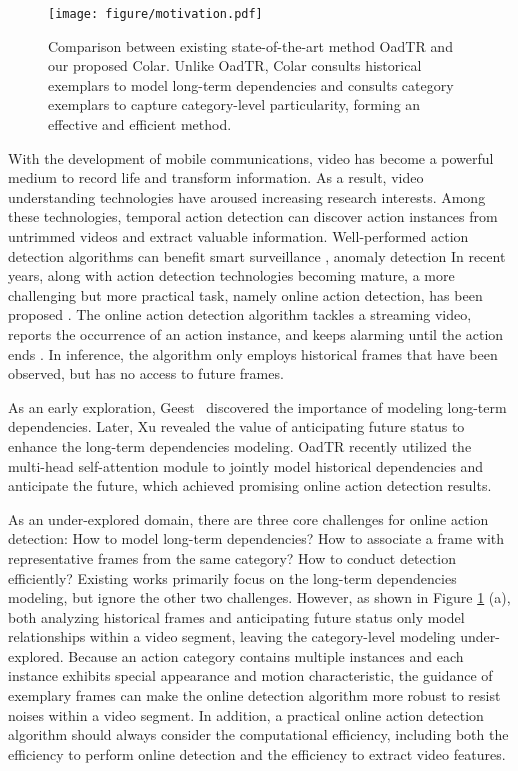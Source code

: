 \documentclass[10pt,twocolumn,letterpaper]{article}
\begin{document}
\begin{figure}[htbp]
\centering
\texttt{[image: figure/motivation.pdf]}
\caption{Comparison between existing state-of-the-art method OadTR \cite{wang2021oadtr} and our proposed Colar. Unlike OadTR, Colar consults historical exemplars to model long-term dependencies and consults category exemplars to capture category-level particularity, forming an effective and efficient method.}
\label{figMotivation}
\vspace{-0.4cm}
\end{figure}

With the development of mobile communications, video has become a powerful medium to record life and transform information. As a result, video understanding technologies have aroused increasing research interests. Among these technologies, temporal action detection \cite{shou2016temporal, wang2021rgb, zhu2021enriching} can discover action instances from untrimmed videos and extract valuable information. Well-performed action detection algorithms can benefit smart surveillance \cite{mhalla2018embedded}, anomaly detection \cite{chandola2009anomaly} \etc In recent years, along with action detection technologies becoming mature, a more challenging but more practical task, namely online action detection, has been proposed \cite{de2016online}. The online action detection algorithm tackles a streaming video, reports the occurrence of an action instance, and keeps alarming until the action ends \cite{de2016online}. In inference, the algorithm only employs historical frames that have been observed, but has no access to future frames.

As an early exploration, Geest~\etal \cite{de2016online} discovered the importance of modeling long-term dependencies. Later, Xu \etal \cite{xu2019temporal} revealed the value of anticipating future status to enhance the long-term dependencies modeling. OadTR \cite{wang2021oadtr} recently utilized the multi-head self-attention module to jointly model historical dependencies and anticipate the future, which achieved promising online action detection results.

As an under-explored domain, there are three core challenges for online action detection: How to model long-term dependencies? How to associate a frame with representative frames from the same category? How to conduct detection efficiently? Existing works \cite{de2016online, xu2019temporal, wang2021oadtr} primarily focus on the long-term dependencies modeling, but ignore the other two challenges. However, as shown in Figure \ref{figMotivation} (a), both analyzing historical frames and anticipating future status only model relationships within a video segment, leaving the category-level modeling under-explored. Because an action category contains multiple instances and each instance exhibits special appearance and motion characteristic, the guidance of exemplary frames can make the online detection algorithm more robust to resist noises within a video segment. In addition, a practical online action detection algorithm should always consider the computational efficiency, including both the efficiency to perform online detection and the efficiency to extract video features.
\end{document}
